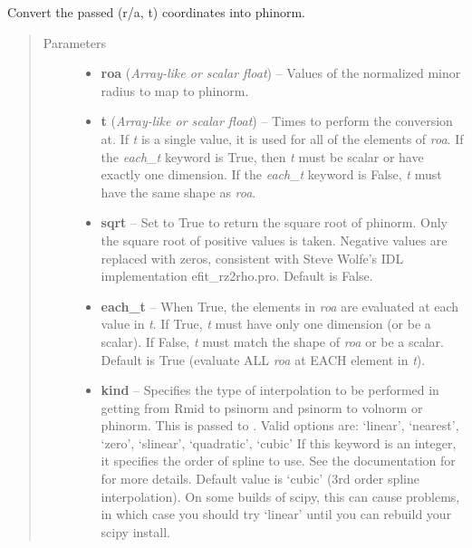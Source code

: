 \documentclass[letterpaper,10pt,english]{sphinxmanual}
\begin{document}
\begin{fulllineitems}
\begin{fulllineitems}
\end{fulllineitems}


\begin{fulllineitems}
\label{eqtools:eqtools.core.Equilibrium.roa2phinorm}
Convert the passed (r/a, t) coordinates into phinorm.
\begin{quote}\begin{description}
\item[{Parameters}] \leavevmode\begin{itemize}
\item {} 
\textbf{roa} (\emph{Array-like or scalar float}) -- Values of the normalized minor
radius to map to phinorm.

\item {} 
\textbf{t} (\emph{Array-like or scalar float}) -- Times to perform the conversion at.
If \emph{t} is a single value, it is used for all of the elements of
\emph{roa}. If the \emph{each\_t} keyword is True, then \emph{t} must be scalar
or have exactly one dimension. If the \emph{each\_t} keyword is False,
\emph{t} must have the same shape as \emph{roa}.

\item {} 
\textbf{sqrt} -- Set to True to return the square root of phinorm.
Only the square root of positive values is taken. Negative
values are replaced with zeros, consistent with Steve Wolfe's
IDL implementation efit\_rz2rho.pro. Default is False.

\item {} 
\textbf{each\_t} -- When True, the elements in \emph{roa} are evaluated
at each value in \emph{t}. If True, \emph{t} must have only one dimension
(or be a scalar). If False, \emph{t} must match the shape of \emph{roa}
or be a scalar. Default is True (evaluate ALL \emph{roa} at EACH
element in \emph{t}).

\item {} 
\textbf{kind} -- Specifies the type of
interpolation to be performed in getting from Rmid to
psinorm and psinorm to volnorm or phinorm. This is passed to
. Valid options are:
`linear', `nearest', `zero', `slinear', `quadratic', `cubic'
If this keyword is an integer, it specifies the order of spline
to use. See the documentation for  for more
details. Default value is `cubic' (3rd order spline
interpolation). On some builds of scipy, this can cause problems,
in which case you should try `linear' until you can rebuild your
scipy install.


\end{itemize}
\end{description}
\end{quote}
\end{fulllineitems}
\end{fulllineitems}
\end{document}

